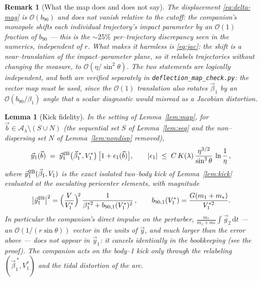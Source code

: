 \documentclass[11pt]{article}
\newcommand{\dd}{\mathrm{d}}
\newcommand{\bv}{\vec b}
\newcommand{\bnt}{b_{90}}
\newcommand{\order}[1]{\mathcal O\!\left(#1\right)}
\newtheorem{lemma}{Lemma}
\newtheorem{remark}{Remark}
\begin{document}
\begin{remark}[What the map does and does not say]
\label{rem:map}
The displacement \eqref{eq:delta-mag} is $\order{\bnt}$ and does \emph{not} vanish relative to the
cutoff: the companion's monopole shifts each individual trajectory's impact parameter by an
$\order1$ fraction of $b_{90}$ --- this is the $\sim25\%$ per--trajectory discrepancy seen in the
numerics, independent of $r$. What makes it harmless is \eqref{eq:jac}: the shift is a
near--\emph{translation} of the impact--parameter plane, so it relabels trajectories without
changing the measure, to $\order{\eta/\sin^2\theta}$. The two statements are logically independent,
and both are verified separately in \texttt{deflection\_map\_check.py}: the vector map must be used,
since the $\order1$ translation also rotates $\vec\beta_1$ by an $\order{\bnt/\beta_1}$ angle that a
scalar diagnostic would misread as a Jacobian distortion.
\end{remark}

\begin{lemma}[Kick fidelity]
\label{lem:fidelity}
In the setting of Lemma~\ref{lem:map}, for $\bv\in\mathcal A_\lambda\setminus(S\cup N)$ (the
sequential set $S$ of Lemma~\ref{lem:seq} and the non--dispersing set $N$ of
Lemma~\ref{lem:nondisp} removed),
\begin{equation}
  \vec y_1(\bv)\;=\;\vec y_1^{\rm 2B}\big(\vec\beta_1^{\,*},V_1^*\big)\,\big[1+\epsilon_1(\bv)\big],
  \qquad
  |\epsilon_1|\;\le\;C\,K(\lambda)\,\frac{\eta^{3/2}}{\sin^2\theta}\,\ln\frac1\eta\,,
  \label{eq:fidelity}
\end{equation}
where $\vec y_1^{\rm 2B}(\vec\beta_1,V_1)$ is the exact isolated two--body kick of
Lemma~\ref{lem:kick} evaluated at the osculating pericenter elements, with magnitude
\begin{equation}
  \big|\vec y_1^{\rm 2B}\big|^2=\Big(\frac{V}{V_1^*}\Big)^{\!2}\,
  \frac{1}{\beta_1^{*2}+b_{90,1}(V_1^*)^2}\,,
  \qquad b_{90,1}(V_1^*)=\frac{G(m_1+m_*)}{V_1^{*2}} .
  \label{eq:y2B}
\end{equation}
In particular the companion's \emph{direct} impulse on the perturber,
$\frac{m_*}{m_1+m_*}\int\vec g_2\,\dd t$ --- an $\order{1/(r\sin\theta)}$ vector in the units of
$\vec y$, and much larger than the error above --- does \emph{not} appear in $\vec y_1$: it cancels
identically in the bookkeeping (see the proof). The companion acts on the body--1 kick only through
the relabeling $(\vec\beta_1^{\,*},V_1^*)$ and the tidal distortion of the arc.
\end{lemma}
\end{document}
